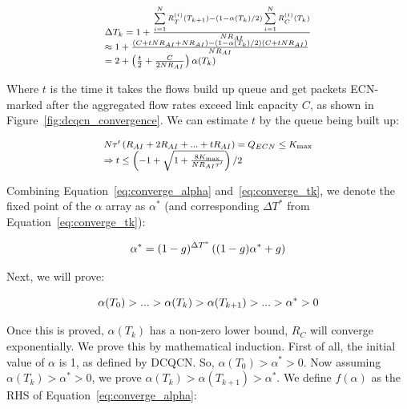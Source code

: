\begin{equation}
\small
\begin{array}{l}
\Delta {T_k} = 1 + \frac{{\sum\limits_{i = 1}^N {R_T^{(i)}({T_{k + 1}})}  - \left( {1 - \alpha ({T_k})/2} \right)\sum\limits_{i = 1}^N {R_C^{(i)}({T_k})} }}{{N{R_{AI}}}}\\
 \approx 1 + \frac{{\left( {C + tN{R_{AI}} + N{R_{AI}}} \right) - \left( {1 - \alpha ({T_k})/2} \right)\left( {C + tN{R_{AI}}} \right)}}{{N{R_{AI}}}}\\
 = 2 + \left( {\frac{t}{2} + \frac{C}{{2N{R_{AI}}}}} \right)\alpha ({T_k})
\end{array}
\label{eq:converge_tk}
\end{equation}

Where $t$ is the time it takes the flows build up queue and get packets ECN-marked after
the aggregated flow rates exceed link capacity $C$, as shown in Figure~\ref{fig:dcqcn_convergence}.
We can estimate $t$ by the queue being built up:

\begin{equation}
\small
\begin{array}{l}
N\tau '\left( {{R_{AI}} + 2{R_{AI}} + ... + t{R_{AI}}} \right) = {Q_{ECN}} \le {K_{\max }}\\
 \Rightarrow t \le \left( { - 1 + \sqrt {1 + \frac{{8{K_{\max }}}}{{N{R_{AI}}\tau '}}} } \right)/2
\end{array}
\end{equation}

Combining Equation~\ref{eq:converge_alpha} and~\ref{eq:converge_tk}, we denote the fixed point of 
the $\alpha$ array as $\alpha^{*}$ (and corresponding $\Delta T^{*}$ from Equation~\ref{eq:converge_tk}):

\begin{equation}
\small
{\alpha ^*} = {(1 - g)^{\Delta {T^*}}}\left( {(1 - g){\alpha ^*} + g} \right)
\end{equation}

Next, we will prove:

\begin{equation}
\small
\alpha ({T_0}) > ... > \alpha ({T_k}) > \alpha ({T_{k + 1}}) > ... > {\alpha ^*} > 0
\end{equation}

Once this is proved, $\alpha ({T_k})$ has a non-zero lower bound, $R_C$ will converge exponentially.
We prove this by mathematical induction. First of all, the initial value of $\alpha$ is 1, as defined
by DCQCN. So, $\alpha ({T_0}) > {\alpha ^*} > 0$. Now assuming $\alpha ({T_k}) > {\alpha ^*} > 0$, we 
prove $\alpha ({T_k}) > \alpha ({T_{k+1}}) > {\alpha ^*}$. We define $f(\alpha)$ as the RHS of 
Equation~\ref{eq:converge_alpha}:

